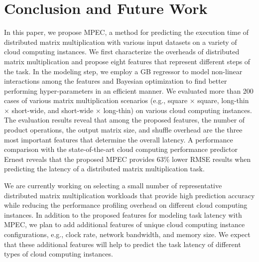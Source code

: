 \documentclass[10pt, conference, compsocconf]{IEEEtran}
\begin{document}
\section{Conclusion and Future Work}
In this paper, we propose MPEC, a method for predicting the execution time of distributed matrix multiplication with various input datasets on a variety of cloud computing instances. We first characterize the overheads of distributed matrix multiplication and propose eight features that represent different steps of the task. In the modeling step, we employ a GB regressor to model non-linear interactions among the features and Bayesian optimization to find better performing hyper-parameters in an efficient manner. We evaluated more than 200 cases of various matrix multiplication scenarios (e.g., square $\times$ square, long-thin $\times$ short-wide, and short-wide $\times$ long-thin) on various cloud computing instances. The evaluation results reveal that among the proposed features, the number of product operations, the output matrix size, and shuffle overhead are the three most important features that determine the overall latency. A performance comparison with the state-of-the-art cloud computing performance predictor Ernest reveals that the proposed MPEC provides 63\% lower RMSE results when predicting the latency of a distributed matrix multiplication task.

We are currently working on selecting a small number of representative distributed matrix multiplication workloads that provide high prediction accuracy while reducing the performance profiling overhead on different cloud computing instances. In addition to the proposed features for modeling task latency with MPEC, we plan to add additional features of unique cloud computing instance configurations, e.g., clock rate, network bandwidth, and memory size. We expect that these additional features will help to predict the task latency of different types of cloud computing instances.


\end{document}
